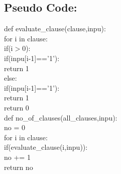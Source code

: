 \documentclass{article}
\begin{document}
\subsection*{Pseudo Code:}
\vspace{5pt}
    def evaluate\_clause(clause,inpu):
        \vspace{2pt}
        \\ \hspace*{20pt}for i in clause:
        \vspace{2pt}
        \\ \hspace*{30pt}if(i$>$0):
        \vspace{2pt}
        \\ \hspace*{50pt} if(inpu[i-1]=='1'):
        \vspace{2pt}
        \\ \hspace*{70pt} return 1
        \vspace{2pt}
        \\ \hspace*{30pt} else:
        \vspace{2pt}
        \\ \hspace*{50pt} if(inpu[i-1]=='1'):
        \vspace{2pt}
        \\ \hspace*{70pt} return 1
        \vspace{2pt}
        \\ \hspace*{20pt} return 0
\vspace{15pt}
        \\def no\_of\_clauses(all\_clauses,inpu):
            \vspace{2pt}
            \\ \hspace*{20pt}no = 0
            \vspace{2pt}
            \\ \hspace*{20pt}for i in clause:
            \vspace{2pt}
            \\ \hspace*{30pt}if(evaluate\_clause(i,inpu)):
            \vspace{2pt}
            \\ \hspace*{50pt} no += 1
            \vspace{2pt}
            \\ \hspace*{20pt} return no
\newpage
\end{document}
